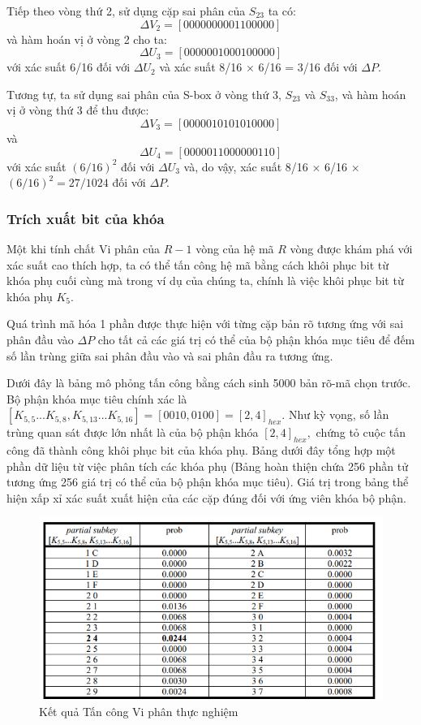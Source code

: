 Tiếp theo vòng thứ 2, sử dụng cặp sai phân của $S_{23}$ ta có:
$$ \Delta V_2 = [0000 0000 0110 0000]$$
và hàm hoán vị ở vòng 2 cho ta:
$$ \Delta U_3 = [0000 0010 0010 0000]$$
với xác suất 6/16 đối với $\Delta U_2$ và xác suất 8/16 $\times$ 6/16 = 3/16 đối với $\Delta P$. 

Tương tự, ta sử dụng sai phân của S-box ở vòng thứ 3, $S_{23}$ và $S_{33}$, và hàm hoán vị ở vòng thứ 3 để thu được:
$$ \Delta V_3 = [0000 0101 0101 0000]$$ 
và 
$$ \Delta U_4 = [0000 0110 0000 0110]$$
với xác suất $(6/16)^2$ đối với $\Delta U_3$ và, do vậy, xác suất 8/16 $\times$ 6/16 $\times$ $(6/16)^2 = 27/1024$ đối với $\Delta P$.
\subsubsection{Trích xuất bit của khóa}
Một khi tính chất Vi phân của $R-1$ vòng của hệ mã $R$ vòng được khám phá với xác suất cao thích hợp, ta có thể tấn công hệ mã bằng cách khôi phục bit từ khóa phụ cuối cùng mà trong ví dụ của chúng ta, chính là việc khôi phục bit từ khóa phụ $K_5$. 

Quá trình mã hóa 1 phần được thực hiện với từng cặp bản rõ tương ứng với sai phân đầu vào $\Delta P$ cho tất cả các giá trị có thể của bộ phận khóa mục tiêu để đếm số lần trùng giữa sai phân đầu vào và sai phân đầu ra tương ứng.

Dưới đây là bảng mô phỏng tấn công bằng cách sinh 5000 bản rõ-mã chọn trước. Bộ phận khóa mục tiêu chính xác là $[K_{5,5}...K_{5,8}, K_{5,13}...K_{5,16}] = [0010,0100] = [2,4]_{hex}$. Như kỳ vọng, số lần trùng quan sát được lớn nhất là của bộ phận khóa $[2,4]_{hex},$ chứng tỏ cuộc tấn công đã thành công khôi phục bit của khóa phụ. Bảng dưới đây tổng hợp một phần dữ liệu từ việc phân tích các khóa phụ (Bảng hoàn thiện chứa 256 phần tử tương ứng 256 giá trị có thể của bộ phận khóa mục tiêu). Giá trị trong bảng thể hiện xấp xỉ xác suất xuất hiện của các cặp đúng đối với ứng viên khóa bộ phận.

\begin{figure}[H]
    \centering
    \includegraphics[scale=0.9]{Các công cụ và kĩ thuật sử dụng trong tấn công/experimential results diff.png}
    
    \caption{Kết quả Tấn công Vi phân thực nghiệm}
\end{figure}










